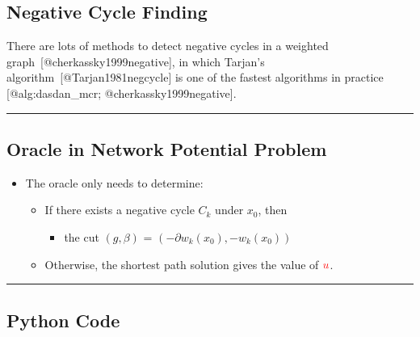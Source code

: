 \documentclass[
]{article}
\providecommand{\tightlist}{%
  \setlength{\itemsep}{0pt}\setlength{\parskip}{0pt}}
\begin{document}
\subsection{Negative Cycle Finding}\label{negative-cycle-finding}

There are lots of methods to detect negative cycles in a weighted
graph~{[}@cherkassky1999negative{]}, in which Tarjan's
algorithm~{[}@Tarjan1981negcycle{]} is one of the fastest algorithms in
practice {[}@alg:dasdan\_mcr; @cherkassky1999negative{]}.

\begin{center}\rule{0.5\linewidth}{0.5pt}\end{center}

\subsection{Oracle in Network Potential
Problem}\label{oracle-in-network-potential-problem}

\begin{itemize}
\tightlist
\item
  The oracle only needs to determine:

  \begin{itemize}
  \tightlist
  \item
    If there exists a negative cycle \(C_k\) under \(x_0\), then

    \begin{itemize}
    \tightlist
    \item
      the cut \((g, \beta)\) = \((-\partial w_k(x_0), -w_k(x_0))\)
    \end{itemize}
  \item
    Otherwise, the shortest path solution gives the value of
    \({\color{red}u}\).
  \end{itemize}
\end{itemize}

\begin{center}\rule{0.5\linewidth}{0.5pt}\end{center}

\subsection{Python Code}\label{python-code}
\end{document}
